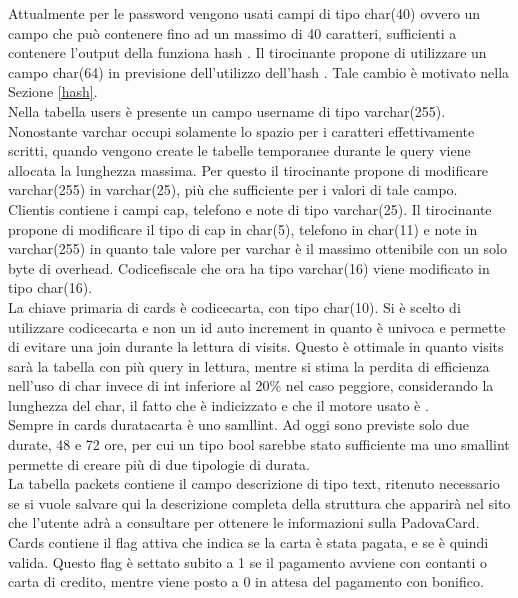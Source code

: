 Attualmente per le password vengono usati campi di tipo char(40) ovvero un campo che può contenere fino ad un massimo di 40 caratteri, sufficienti a contenere l'output della funziona hash . Il tirocinante propone di utilizzare un campo char(64) in previsione dell'utilizzo dell'hash . Tale cambio è motivato nella Sezione \ref{hash}. \\

Nella tabella users è presente un campo username di tipo varchar(255). Nonostante varchar occupi solamente lo spazio per i caratteri effettivamente scritti, quando vengono create le tabelle temporanee durante le query viene allocata la lunghezza massima. Per questo il tirocinante propone di modificare varchar(255) in varchar(25), più che sufficiente per i valori di tale campo. \\

Clientis contiene i campi cap, telefono e note di tipo varchar(25). Il tirocinante propone di modificare il tipo di cap in char(5), telefono in char(11) e note in varchar(255) in quanto tale valore per varchar è il massimo ottenibile con un solo byte di overhead. Codicefiscale che ora ha tipo varchar(16) viene modificato in tipo char(16). \\

La chiave primaria di cards è codicecarta, con tipo char(10). Si è scelto di utilizzare codicecarta e non un id auto increment in quanto è univoca e permette di evitare una join durante la lettura di visits. Questo è ottimale in quanto visits sarà la tabella con più query in lettura, mentre si stima la perdita di efficienza nell'uso di char invece di int inferiore al 20\% nel caso peggiore, considerando la lunghezza del char, il fatto che è indicizzato e che il motore usato è . \\

Sempre in cards duratacarta è uno samllint. Ad oggi sono previste solo due durate, 48 e 72 ore, per cui un tipo bool sarebbe stato sufficiente ma uno smallint permette di creare più di due tipologie di durata. \\

La tabella packets contiene il campo descrizione di tipo text, ritenuto necessario se si vuole salvare qui la descrizione completa della struttura che apparirà nel sito che l'utente adrà a consultare per ottenere le informazioni sulla PadovaCard. \\

Cards contiene il flag attiva che indica se la carta è stata pagata, e se è quindi valida. Questo flag è settato subito a 1 se il pagamento avviene con contanti o carta di credito, mentre viene posto a 0 in attesa del pagamento con bonifico. \\

